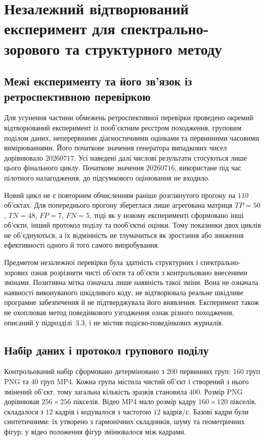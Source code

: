 \section{Незалежний відтворюваний експеримент для спектрально-зорового та структурного методу}
\label{sec:ch4_ind_svs}

\subsection{Межі експерименту та його зв'язок із ретроспективною перевіркою}
\label{subsec:ch4_ind_svs_scope}

Для усунення частини обмежень ретроспективної перевірки проведено окремий відтворюваний експеримент із пооб'єктним реєстром походження, груповим поділом даних, неперервними діагностичними оцінками та первинними часовими вимірюваннями. Його початкове значення генератора випадкових чисел дорівнювало $20260717$. Усі наведені далі числові результати стосуються лише цього фінального циклу. Початкове значення $20260716$, використане під час пілотного налагодження, до підсумкового оцінювання не входило.

Новий цикл не є повторним обчисленням раніше розглянутого прогону на $110$ об'єктах. Для попереднього прогону збереглася лише агрегована матриця $TP=50$, $TN=48$, $FP=7$, $FN=5$, тоді як у новому експерименті сформовано інші об'єкти, інший протокол поділу та пооб'єктні оцінки. Тому показники двох циклів не об'єднуються, а їх відмінність не тлумачиться як зростання або зниження ефективності одного й того самого випробування.

Предметом незалежної перевірки була здатність структурних і спектрально-зорових ознак розрізняти чисті об'єкти та об'єкти з контрольовано внесеними змінами. Позитивна мітка означала лише наявність такої зміни. Вона не означала наявності виконуваного шкідливого коду, не відтворювала реальне шкідливе програмне забезпечення й не підтверджувала його виявлення. Експеримент також не охоплював метод поведінкового узгодження ознак різного походження, описаний у підрозділі~3.3, і не містив подієво-поведінкових журналів.

\subsection{Набір даних і протокол групового поділу}
\label{subsec:ch4_ind_svs_protocol}

Контрольований набір сформовано детерміновано з $200$ первинних груп: $160$ груп PNG та $40$ груп MP4. Кожна група містила чистий об'єкт і створений з нього змінений об'єкт, тому загальна кількість зразків становила $400$. Розмір PNG дорівнював $256\times256$ пікселів. Відео MP4 мало розмір кадру $160\times120$ пікселів, складалося з $12$ кадрів і кодувалося з частотою $12$ кадрів/с. Базові кадри були синтетичними: їх утворено з гармонічних складників, шуму та геометричних фігур; у відео положення фігур змінювалося між кадрами.

